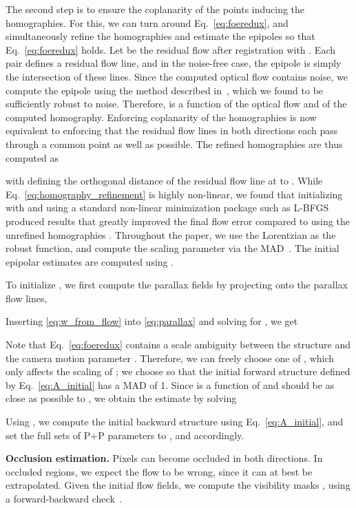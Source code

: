 \documentclass[10pt,twocolumn,letterpaper]{article}
\begin{document}
The second step is to ensure the coplanarity of the points inducing the homographies.
For this, we can turn around Eq.~\eqref{eq:foeredux}, and simultaneously refine the homographies and estimate the epipoles  so that Eq.~\eqref{eq:foeredux} holds.
Let  be the residual flow after registration with .
Each pair  defines a residual flow line, and in the noise-free case, the epipole  is simply the intersection of these lines.
Since the computed optical flow contains noise, we compute the epipole using the method described in~\cite{MacLean:1999:RemovalOfTranslationBias}, which we found to be sufficiently robust to noise.
Therefore,  is a function of the optical flow and of the computed homography.
Enforcing coplanarity of the homographies is now equivalent to
enforcing that the residual flow lines in both directions each pass through a common point as well as possible.
The refined homographies are thus computed as

with  defining the orthogonal distance of the residual flow line at 
to .
While Eq.~\eqref{eq:homography_refinement} is highly non-linear, we found that initializing with  and using a standard non-linear minimization package such as L-BFGS~\cite{Nocedal:1980:LBFGS} produced results that greatly improved the final flow error compared to using the unrefined homographies .
Throughout the paper, we use the Lorentzian  as the robust function, and compute the scaling parameter  via the MAD~\cite{Black:1999:EdgesAsOutliers}.
The initial epipolar estimates  are computed using .

To initialize , we first compute the parallax fields by projecting  onto the parallax flow lines,

Inserting \eqref{eq:w_from_flow} into \eqref{eq:parallax} and solving for , we get

Note that Eq.~\eqref{eq:foeredux} contains a scale ambiguity between the structure  and the camera motion parameter .
Therefore, we can freely choose one of , which only affects the scaling of ; we choose  so that the initial forward structure  defined by Eq.~\eqref{eq:A_initial} has a MAD of 1.
Since  is a function of  and should be as close as possible to , we obtain the estimate  by solving

Using , we compute the initial backward structure  using Eq.~\eqref{eq:A_initial}, and set the full sets of P+P parameters to , and  accordingly.

{\bf Occlusion estimation.}
\noindent
Pixels can become occluded in both directions. In occluded regions, we expect the flow to be wrong, since it can at best be extrapolated.
Given the initial flow fields,
we compute the visibility masks ,  using a forward-backward check~\cite{Kalal2010}.
\end{document}
